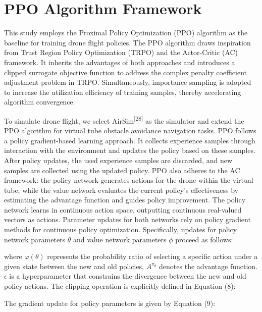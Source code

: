 \documentclass[preprint,12pt,authoryear]{elsarticle}
\begin{document}
\section{PPO Algorithm Framework}

This study employs the Proximal Policy Optimization (PPO) algorithm as the baseline for training drone flight policies. The PPO algorithm draws inspiration from Trust Region Policy Optimization (TRPO) and the Actor-Critic (AC) framework. It inherits the advantages of both approaches and introduces a clipped surrogate objective function to address the complex penalty coefficient adjustment problem in TRPO. Simultaneously, importance sampling is adopted to increase the utilization efficiency of training samples, thereby accelerating algorithm convergence.

To simulate drone flight, we select AirSim\textsuperscript{[28]} as the simulator and extend the PPO algorithm for virtual tube obstacle avoidance navigation tasks. PPO follows a policy gradient-based learning approach. It collects experience samples through interaction with the environment and updates the policy based on these samples. After policy updates, the used experience samples are discarded, and new samples are collected using the updated policy. PPO also adheres to the AC framework: the policy network generates actions for the drone within the virtual tube, while the value network evaluates the current policy's effectiveness by estimating the advantage function and guides policy improvement. The policy network learns in continuous action space, outputting continuous real-valued vectors as actions. Parameter updates for both networks rely on policy gradient methods for continuous policy optimization. Specifically, updates for policy network parameters \(\theta\) and value network parameters \(\phi\) proceed as follows:


where \(\varphi(\theta)\) represents the probability ratio of selecting a specific action under a given state between the new and old policies, \(A^{\pi_\theta}\) denotes the advantage function. \(\epsilon\) is a hyperparameter that constrains the divergence between the new and old policy actions. The clipping operation is explicitly defined in Equation (8):


The gradient update for policy parameters is given by Equation (9):

\end{document}
